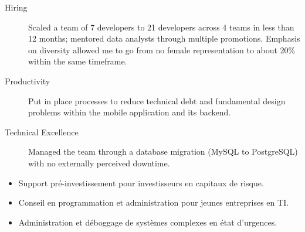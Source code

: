 \begin{langen}
\begin{description}%
\item[Hiring] Scaled a team of 7 developers to 21 developers across 4 teams in less than 12 months; mentored data analysts through multiple promotions. Emphasis on diversity allowed me to go from no female representation to about 20\% within the same timeframe.
\item[Productivity] Put in place processes to reduce technical debt and fundamental design problems within the mobile application and its backend.
\item[Technical Excellence] Managed the team through a database migration (MySQL to PostgreSQL) with no externally perceived downtime.
\end{description}
\end{langen}
\begin{langfr}
\begin{itemize}%
\item Support pr\'{e}-investissement pour investisseurs en capitaux de risque.
\item Conseil en programmation et administration pour jeunes entreprises en TI.
\item Administration et d\'{e}boggage de syst\`{e}mes complexes en \'{e}tat d'urgences.
\end{itemize}
\end{langfr}

\vspace{4 mm}


